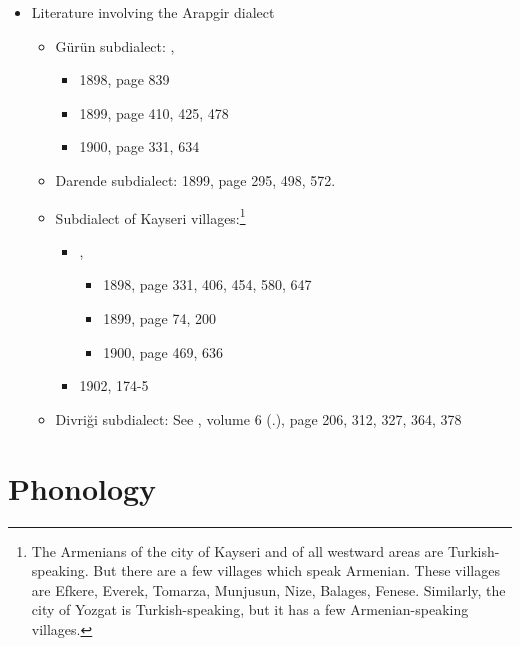 \begin{itemize}
	\item Literature involving the Arapgir dialect
	\begin{itemize}
		\item Gürün subdialect: , 
		\begin{itemize}
			\item 1898, page 839 
			\item 1899, page 410, 425, 478 
			\item 1900, page 331, 634
			
		\end{itemize}
		
		\item Darende subdialect:  1899, page 295, 498, 572. 
		\item 
		Subdialect of Kayseri villages:\footnote{The Armenians of the city of Kayseri and of all westward areas are Turkish-speaking. But there are a few villages which speak Armenian. These villages are Efkere, Everek, Tomarza, Munjusun, Nize, Balages, Fenese. Similarly, the city of Yozgat is Turkish-speaking, but it has a few Armenian\hyp speaking villages.} 
		\begin{itemize}
			\item {},
			\begin{itemize}
				\item 1898, page 331, 406, 454, 580, 647 
				\item 1899, page 74, 200 
				\item 1900, page 469, 636
			\end{itemize}
			\item {} 1902,  174-5
		\end{itemize}
		
		\item Divriği subdialect: See , volume 6 (.), page 206, 312, 327, 364, 378
		
	\end{itemize}
\end{itemize}



\begin{adjarianpage}\label{page:216}\end{adjarianpage}%


\section{Phonology}

